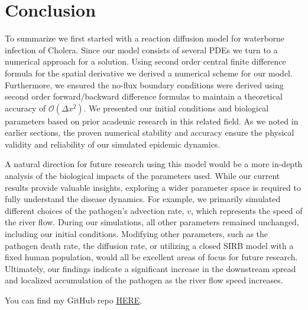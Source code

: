 \section{Conclusion}
To summarize we first started with a reaction diffusion model for waterborne infection of Cholera. Since our model consists of several PDEs we turn to a numerical approach for a solution. Using second order central finite difference formula for the spatial derivative we derived a numerical scheme for our model. Furthermore, we ensured the no-flux boundary conditions were derived using second order forward/backward difference formulas to maintain a theoretical accuracy of $\mathcal{O}(\Delta x^2)$. We presented our initial conditions and biological parameters based on prior academic research in this related field. As we noted in earlier sections, the proven numerical stability and accuracy ensure the physical validity and reliability of our simulated epidemic dynamics. 

\quad A natural direction for future research using this model would be a more in-depth analysis of the biological impacts of the parameters used. While our current results provide valuable insights, exploring a wider parameter space is required to fully understand the disease dynamics. For example, we primarily simulated different choices of the pathogen's advection rate, $v$, which represents the speed of the river flow. During our simulations, all other parameters remained unchanged, including our initial conditions. Modifying other parameters, such as the pathogen death rate, the diffusion rate, or utilizing a closed SIRB model with a fixed human population, would all be excellent areas of focus for future research. Ultimately, our findings indicate a significant increase in the downstream spread and localized accumulation of the pathogen as the river flow speed increases.

\quad You can find my GitHub repo \href{https://github.com/ethanreyes78/phd-rd-solver}{HERE}.
